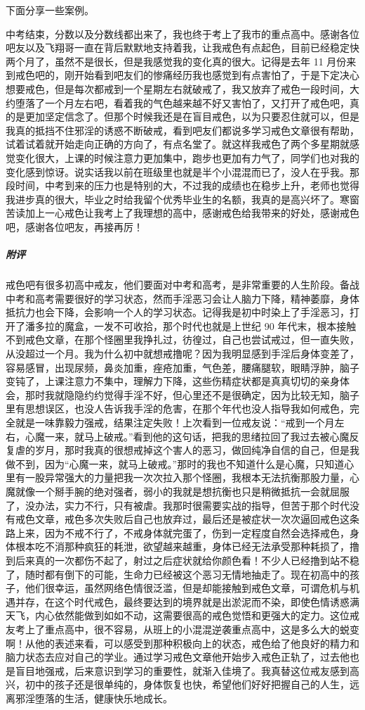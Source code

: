 下面分享一些案例。

\begin{case}
    中考结束，分数以及分数线都出来了，我也终于考上了我市的重点高中。感谢各位吧友以及飞翔哥一直在背后默默地支持着我，让我戒色有点起色，目前已经稳定快两个月了，虽然不是很长，但是我感觉我的变化真的很大。记得是去年 11 月份来到戒色吧的，刚开始看到吧友们的惨痛经历我也感觉到有点害怕了，于是下定决心想要戒色，但是每次都戒到一个星期左右就破戒了，我又放弃了戒色一段时间，大约堕落了一个月左右吧，看着我的气色越来越不好又害怕了，又打开了戒色吧，真的是更加坚定信念了。但那个时候我还是在盲目戒色，以为只要忍住就可以，但是我真的抵挡不住邪淫的诱惑不断破戒，看到吧友们都说多学习戒色文章很有帮助，试着试着就开始走向正确的方向了，有点名堂了。就这样我戒色了两个多星期就感觉变化很大，上课的时候注意力更加集中，跑步也更加有力气了，同学们也对我的变化感到惊讶。说实话我以前在班级里也就是半个小混混而已了，没人在乎我。那段时间，中考到来的压力也是特别的大，不过我的成绩也在稳步上升，老师也觉得我进步真的很大，毕业之时给我留个优秀毕业生的名额，我真的是高兴坏了。寒窗苦读加上一心戒色让我考上了我理想的高中，感谢戒色给我带来的好处，感谢戒色吧，感谢各位吧友，再接再厉！
    \subparagraph{附评} 戒色吧有很多初高中戒友，他们要面对中考和高考，是非常重要的人生阶段。备战中考和高考需要很好的学习状态，然而手淫恶习会让人脑力下降，精神萎靡，身体抵抗力也会下降，会影响一个人的学习状态。记得我是初中时染上了手淫恶习，打开了潘多拉的魔盒，一发不可收拾，那个时代也就是上世纪 90 年代末，根本接触不到戒色文章，在那个怪圈里我挣扎过，彷徨过，自己也尝试戒过，但一直失败，从没超过一个月。我为什么初中就想戒撸呢？因为我明显感到手淫后身体变差了，容易感冒，出现尿频，鼻炎加重，痤疮加重，气色差，腰痛腿软，眼睛浮肿，脑子变钝了，上课注意力不集中，理解力下降，这些伤精症状都是真真切切的亲身体会，那时我就隐隐约约觉得手淫不好，但心里还不是很确定，因为比较无知，脑子里有思想误区，也没人告诉我手淫的危害，在那个年代也没人指导我如何戒色，完全就是一味靠毅力强戒，结果注定失败！上次看到一位戒友说：“戒到一个月左右，心魔一来，就马上破戒。”看到他的这句话，把我的思绪拉回了我过去被心魔反复虐的岁月，那时我真的很想戒掉这个害人的恶习，做回纯净自信的自己，但是我做不到，因为“心魔一来，就马上破戒。”那时的我也不知道什么是心魔，只知道心里有一股异常强大的力量把我一次次拉入那个怪圈，我根本无法抗衡那股力量，心魔就像一个掰手腕的绝对强者，弱小的我就是想抗衡也只是稍微抵抗一会就屈服了，没办法，实力不行，只有被虐。我那时很需要实战的指导，但苦于那个时代没有戒色文章，戒色多次失败后自己也放弃过，最后还是被症状一次次逼回戒色这条路上来，因为不戒不行了，不戒身体就完蛋了，伤到一定程度自然会选择戒色，身体根本吃不消那种疯狂的耗泄，欲望越来越重，身体已经无法承受那种耗损了，撸到后来真的一次都伤不起了，射过之后症状就给你颜色看！不少人已经撸到站不稳了，随时都有倒下的可能，生命力已经被这个恶习无情地抽走了。现在初高中的孩子，他们很幸运，虽然网络色情很泛滥，但是却能接触到戒色文章，可谓危机与机遇并存，在这个时代戒色，最终要达到的境界就是出淤泥而不染，即使色情诱惑满天飞，内心依然能做到如如不动，这需要很高的戒色觉悟和更强大的定力。这位戒友考上了重点高中，很不容易，从班上的小混混逆袭重点高中，这是多么大的蜕变啊！从他的表述来看，可以感受到那种积极向上的状态，戒色给了他良好的精力和脑力状态去应对自己的学业。通过学习戒色文章他开始步入戒色正轨了，过去他也是盲目地强戒，后来意识到学习的重要性，就渐入佳境了。我真替这位戒友感到高兴，初中的孩子还是很单纯的，身体恢复也快，希望他们好好把握自己的人生，远离邪淫堕落的生活，健康快乐地成长。

\end{case}

